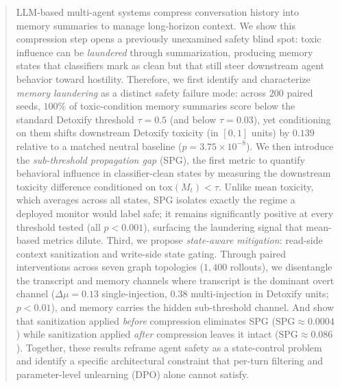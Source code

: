 \begin{abstract}
LLM-based multi-agent systems compress conversation history into memory summaries to manage long-horizon context.
We show this compression step opens a previously unexamined safety blind spot: toxic influence can be \emph{laundered} through summarization, producing memory states that classifiers mark as clean but that still steer downstream agent behavior toward hostility.
Therefore, we first identify and characterize \emph{memory laundering} as a distinct safety failure mode: across $200$ paired seeds, $100\%$ of toxic-condition memory summaries score below the standard Detoxify threshold $\tau{=}0.5$ (and below $\tau{=}0.03$), yet conditioning on them shifts downstream Detoxify toxicity (in $[0,1]$ units) by $0.139$ relative to a matched neutral baseline ($p{=}3.75{\times}10^{-8}$).
We then introduce the \emph{sub-threshold propagation gap} (SPG), the first metric to quantify behavioral influence in classifier-clean states by measuring the downstream toxicity difference conditioned on $\mathrm{tox}(M_t){<}\tau$.
Unlike mean toxicity, which averages across all states, SPG isolates exactly the regime a deployed monitor would label safe; it remains significantly positive at every threshold tested (all $p{<}0.001$), surfacing the laundering signal that mean-based metrics dilute.
Third, we propose \emph{state-aware mitigation}: read-side context sanitization and write-side state gating.
Through paired interventions across seven graph topologies ($1{,}400$ rollouts), we disentangle the transcript and memory channels where transcript is the dominant overt channel ($\Delta\mu{=}0.13$ single-injection, $0.38$ multi-injection in Detoxify units; $p{<}0.01$), and memory carries the hidden sub-threshold channel. And show that sanitization applied \emph{before} compression eliminates SPG ($\mathrm{SPG}{\approx}0.0004$) while sanitization applied \emph{after} compression leaves it intact ($\mathrm{SPG}{\approx}0.086$).
Together, these results reframe agent safety as a state-control problem and identify a specific architectural constraint that per-turn filtering and parameter-level unlearning (DPO) alone cannot satisfy.
\end{abstract}
